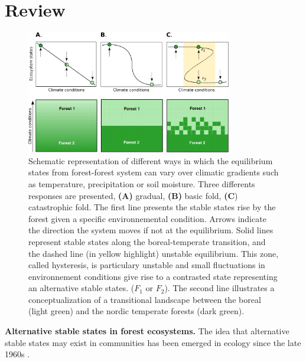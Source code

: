 \section{Review} 

\begin{figure}[t]
	\begin{center}
	\includegraphics[width=0.8\textwidth]{fig/states.pdf}
	\end{center}
	\caption{Schematic representation of different ways in which the equilibrium
	states from forest-forest system can vary over climatic gradients such as temperature, precipitation
	or soil moisture. Three differents responses are presented,
	\textbf{(A)} gradual, \textbf{(B)} basic fold, \textbf{(C}) catastrophic fold.
	The first line presents the stable states rise by the forest
	given a specific environnemental condition. Arrows indicate the
	direction the system moves if not at the equilibrium. 
	Solid lines represent stable states along the boreal-temperate
	transition, and the dashed line (in yellow highlight) unstable equilibrium. This zone,
	called hysteresis, is particulary unstable and small fluctuations in
	environnement conditions give rise to a contrasted state representing an
	alternative stable states. ($F_1$ or $F_2$). 
	The second line illustrates a conceptualization of a transitional landscape
	between the boreal (light green) and the nordic temperate forests (dark
	green).}
	\label{fig1}
	\vspace{-1.25em}
\end{figure}



\textbf{Alternative stable states in forest ecosystems.} The idea that
alternative stable states may exist in communities has been emerged in ecology
since the late 1960s \cite{Scheffer2001,Society2014a}. 

